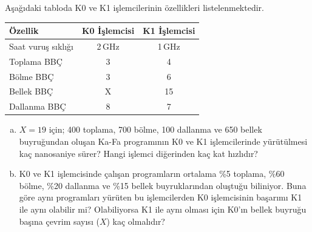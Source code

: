 \begin{alistirma}[\zor]
Aşağıdaki tabloda K0 ve K1 işlemcilerinin özellikleri listelenmektedir.

\begin{center}
\begin{tabular}{lcc}
\toprule
\textbf{Özellik} & \textbf{K0 İşlemcisi} & \textbf{K1 İşlemcisi} \\
\midrule
Saat vuruş sıklığı & 2\,GHz & 1\,GHz \\
Toplama BBÇ & 3 & 4 \\
Bölme BBÇ & 3 & 6 \\
Bellek BBÇ & X & 15 \\
Dallanma BBÇ & 8 & 7 \\
\bottomrule
\end{tabular}
\end{center}

\begin{enumerate}[(a)]
    \item $X=19$ için; 400 toplama, 700 bölme, 100 dallanma ve 650 bellek buyruğundan oluşan Ka-Fa programının K0 ve K1 işlemcilerinde yürütülmesi kaç nanosaniye sürer? Hangi işlemci diğerinden kaç kat hızlıdır?
    \item K0 ve K1 işlemcisinde çalışan programların ortalama \%5 toplama, \%60 bölme, \%20 dallanma ve \%15 bellek buyruklarından oluştuğu biliniyor. Buna göre aynı programları yürüten bu işlemcilerden K0 işlemcisinin başarımı K1 ile aynı olabilir mi? Olabiliyorsa K1 ile aynı olması için K0'ın bellek buyruğu başına çevrim sayısı ($X$) kaç olmalıdır?
\end{enumerate}
\end{alistirma}

